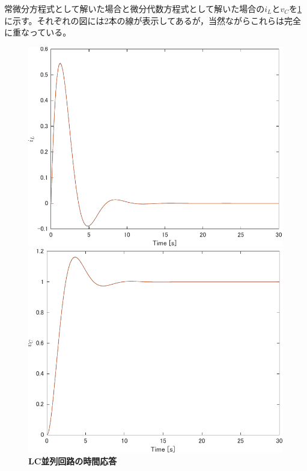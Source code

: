 \documentclass[tombow,dvipdfmx]{corona-a5-1.1}
\begin{document}
\begin{例}[簡単な例題]
常微分方程式として解いた場合と微分代数方程式として解いた場合の$i_L$と$v_C$を\ref{fig:solution_dae}
に示す。それぞれの図には2本の線が表示してあるが，当然ながらこれらは完全に重なっている。
\begin{figure}[t]
  \centering
  {
    \begin{minipage}{0.49\linewidth}
      \centering
      \includegraphics[width = 1.0\linewidth]{figs/i_L}
    \end{minipage}
    \begin{minipage}{0.49\linewidth}
      \centering
      \includegraphics[width = 1.0\linewidth]{figs/v_C}
    \end{minipage}
    \medskip
    \caption{\textbf{LC並列回路の時間応答}
    }
    \label{fig:solution_dae}
  }
  \medskip
\end{figure}
\end{例}
\end{document}
